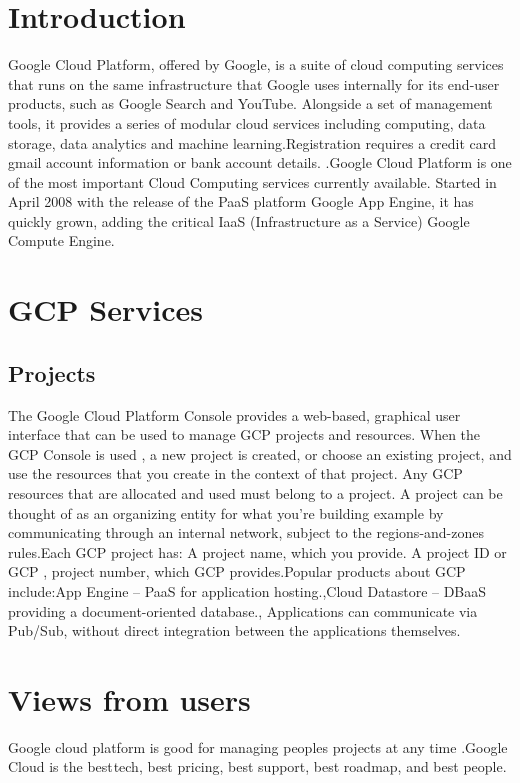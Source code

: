 \documentclass[10pt,]{article}
\begin{document}
\newpage

\section{Introduction}
Google Cloud Platform, offered by Google, is a suite of cloud computing services that runs on the same infrastructure that Google uses internally for its end-user products, such as Google Search and YouTube.\cite{s1} Alongside a set of management tools, it provides a series of modular cloud services including computing, data storage, data analytics and machine learning.\cite{s2}Registration requires a credit card gmail account information or bank account details. \cite{s3}.Google Cloud Platform is one of the most important Cloud Computing services currently available. Started in April 2008 with the release of the PaaS platform Google App Engine, it has quickly grown, adding the critical IaaS (Infrastructure as a Service) Google Compute Engine. 
\section{GCP Services}
\subsection{Projects}
The Google Cloud Platform Console provides a web-based, graphical user interface that  can be used to manage  GCP projects and resources. When the GCP Console is used ,  a new project is created, or choose an existing project, and use the resources that you create in the context of that project. Any GCP resources that are allocated and used must belong to a project. A project can be thought of as an organizing entity for what you're building example by communicating through an internal network, subject to the regions-and-zones rules.Each GCP project has: A project name, which you provide. A project ID or GCP , project number, which GCP provides.Popular products about GCP include:App Engine – PaaS for application hosting.\cite{s15},Cloud Datastore – DBaaS providing a document-oriented database.\cite{s8}, Applications can communicate via Pub/Sub, without direct integration between the applications themselves.\cite{s5}
\section{Views from users}
Google cloud platform is good for managing peoples projects at any time \cite{s12}.Google Cloud is the best tech, best pricing, best support, best roadmap, and best people.
\end{document}
